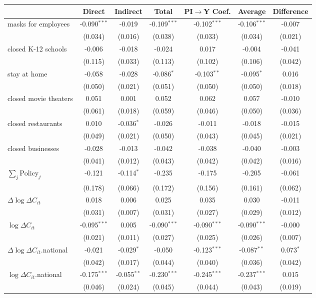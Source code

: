 
\begin{tabular}{lccccc|>{}c}
\toprule
  & Direct & Indirect & Total & PI$\to$Y Coef. & Average & Difference\\
\midrule
masks for employees & -0.090$^{***}$ & -0.019 & -0.109$^{***}$ & -0.102$^{***}$ & -0.106$^{***}$ & -0.007\\
 & (0.034) & (0.016) & (0.038) & (0.033) & (0.034) & (0.021)\\
closed K-12 schools & -0.006 & -0.018 & -0.024 & 0.017 & -0.004 & -0.041\\
 & (0.115) & (0.033) & (0.113) & (0.102) & (0.106) & (0.042)\\
stay at home & -0.058 & -0.028 & -0.086$^{*}$ & -0.103$^{**}$ & -0.095$^{*}$ & 0.016\\
 & (0.050) & (0.021) & (0.051) & (0.050) & (0.050) & (0.018)\\
closed movie theaters & 0.051 & 0.001 & 0.052 & 0.062 & 0.057 & -0.010\\
 & (0.061) & (0.018) & (0.059) & (0.046) & (0.050) & (0.036)\\
closed restaurants & 0.010 & -0.036$^{*}$ & -0.026 & -0.011 & -0.018 & -0.015\\
 & (0.049) & (0.021) & (0.050) & (0.043) & (0.045) & (0.021)\\
closed businesses & -0.028 & -0.013 & -0.042 & -0.038 & -0.040 & -0.003\\
 & (0.041) & (0.012) & (0.043) & (0.042) & (0.042) & (0.016)\\
$\sum_j \mathrm{Policy}_j$ & -0.121 & -0.114$^{*}$ & -0.235 & -0.175 & -0.205 & -0.061\\
 & (0.178) & (0.066) & (0.172) & (0.156) & (0.161) & (0.062)\\
$\Delta \log \Delta C_{it}$ & 0.018 & 0.006 & 0.025 & 0.035 & 0.030 & -0.011\\
 & (0.031) & (0.007) & (0.031) & (0.027) & (0.029) & (0.012)\\
$\log \Delta C_{it}$ & -0.095$^{***}$ & 0.005 & -0.090$^{***}$ & -0.090$^{***}$ & -0.090$^{***}$ & -0.000\\
 & (0.021) & (0.011) & (0.027) & (0.025) & (0.026) & (0.007)\\
$\Delta \log \Delta C_{it}$.national & -0.021 & -0.029$^{*}$ & -0.050 & -0.123$^{***}$ & -0.087$^{**}$ & 0.073$^{*}$\\
 & (0.042) & (0.017) & (0.044) & (0.040) & (0.036) & (0.042)\\
$\log \Delta C_{it}$.national & -0.175$^{***}$ & -0.055$^{**}$ & -0.230$^{***}$ & -0.245$^{***}$ & -0.237$^{***}$ & 0.015\\
 & (0.046) & (0.024) & (0.045) & (0.044) & (0.043) & (0.019)\\
\bottomrule
\end{tabular}